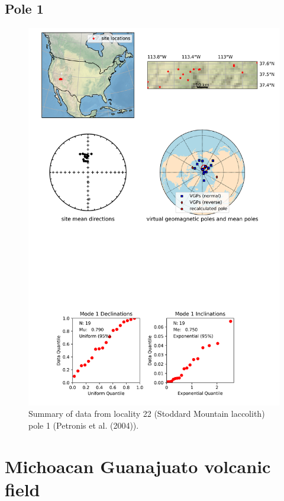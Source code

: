 \subsection{Pole 1}


\begin{figure}[H]
\centering
\includegraphics[width=5 in]{./22/1/pole_summary.png}
\caption{Summary of data from locality 22 (Stoddard Mountain laccolith) pole 1 (Petronis et al. (2004)).}
\end{figure}

\section{Michoacan Guanajuato volcanic field}
